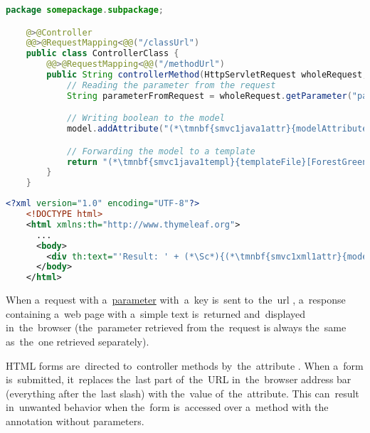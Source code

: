 \begin{lstlisting}[language=Java, title={Controller class}]
    package somepackage.subpackage;

    @>@Controller
    @@>@RequestMapping<@@("/classUrl")
    public class ControllerClass {
        @@>@RequestMapping<@@("/methodUrl")
        public String controllerMethod(HttpServletRequest wholeRequest, @@>@RequestParam<@@("paramKey") String singleParameter, Model model) {
            // Reading the parameter from the request
            String parameterFromRequest = wholeRequest.getParameter("paramKey");

            // Writing boolean to the model
            model.addAttribute("(*\tmnbf{smvc1java1attr}{modelAttribute}[ForestGreen]*)", parameterFromRequest.equals(singleParameter));

            // Forwarding the model to a template
            return "(*\tmnbf{smvc1java1templ}{templateFile}[ForestGreen]*)";
        }
    }
\end{lstlisting}
\begin{lstlisting}[language=XML, title={Thymeleaf template file called \tmnbf{smvc1xml1templ}{\textit{templateFile}}\textit{.html}}]
    <?xml version="1.0" encoding="UTF-8"?>
    <!DOCTYPE html>
    <html xmlns:th="http://www.thymeleaf.org">
      ...
      <body>
        <div th:text="'Result: ' + (*\Sc*){(*\tmnbf{smvc1xml1attr}{modelAttribute}[ForestGreen]*)}"></div>
      </body>
    </html>
\end{lstlisting}

\noindent When a~request with a~\hyperref[jspattributeparameter]{parameter} with~a~key  is~sent to~the~url , a~response containing a~web page with a~simple text  is~returned and~displayed in~the~browser (the~parameter retrieved from the~request is always the~same as~the~one retrieved separately).
\newpage

\warning HTML forms are~directed to~controller methods by~the~attribute .
When a~form is~submitted, it~replaces the~last part of~the~URL in~the~browser address bar (everything after the~last slash) with the~value of~the~attribute.
This can~result in~unwanted behavior when the~form is~accessed over a~method with the~ annotation without parameters.

